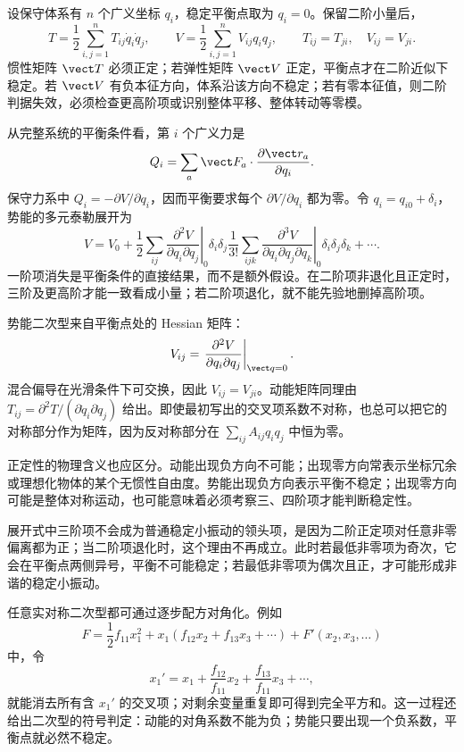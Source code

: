 设保守体系有 $n$ 个广义坐标 $q_i$，稳定平衡点取为 $q_i=0$。保留二阶小量后，
\begin{equation}
 T=\frac12\sum_{i,j=1}^nT_{ij}\dot q_i\dot q_j,\qquad
 V=\frac12\sum_{i,j=1}^nV_{ij}q_iq_j,\qquad
 T_{ij}=T_{ji},\quad V_{ij}=V_{ji}.
 \label{r2ch04:eq:019}
\end{equation}
惯性矩阵 $\vect T$ 必须正定；若弹性矩阵 $\vect V$ 正定，平衡点才在二阶近似下稳定。若 $\vect V$ 有负本征方向，体系沿该方向不稳定；若有零本征值，则二阶判据失效，必须检查更高阶项或识别整体平移、整体转动等零模。

从完整系统的平衡条件看，第 $i$ 个广义力是
\[
 Q_i=\sum_a\vect F_a\cdot\frac{\partial\vect r_a}{\partial q_i}.
\]
保守力系中 $Q_i=-\partial V/\partial q_i$，因而平衡要求每个 $\partial V/\partial q_i$ 都为零。令 $q_i=q_{i0}+\delta_i$，势能的多元泰勒展开为
\[
 V=V_0+\frac12\sum_{ij}
 \left.\frac{\partial^2V}{\partial q_i\partial q_j}\right|_0
 \delta_i\delta_j
\frac1{3!}\sum_{ijk}
 \left.\frac{\partial^3V}{\partial q_i\partial q_j\partial q_k}\right|_0
 \delta_i\delta_j\delta_k+\cdots .
\]
一阶项消失是平衡条件的直接结果，而不是额外假设。在二阶项非退化且正定时，三阶及更高阶才能一致看成小量；若二阶项退化，就不能先验地删掉高阶项。

势能二次型来自平衡点处的 Hessian 矩阵：
\[
 V_{ij}=\left.\frac{\partial^2V}{\partial q_i\partial q_j}\right|_{\vect q=0}.
\]
混合偏导在光滑条件下可交换，因此 $V_{ij}=V_{ji}$。动能矩阵同理由
$T_{ij}=\partial^2T/(\partial\dot q_i\partial\dot q_j)$ 给出。即使最初写出的交叉项系数不对称，也总可以把它的对称部分作为矩阵，因为反对称部分在
$\sum_{ij}A_{ij}q_iq_j$ 中恒为零。

正定性的物理含义也应区分。动能出现负方向不可能；出现零方向常表示坐标冗余或理想化物体的某个无惯性自由度。势能出现负方向表示平衡不稳定；出现零方向可能是整体对称运动，也可能意味着必须考察三、四阶项才能判断稳定性。

展开式中三阶项不会成为普通稳定小振动的领头项，是因为二阶正定项对任意非零偏离都为正；当二阶项退化时，这个理由不再成立。此时若最低非零项为奇次，它会在平衡点两侧异号，平衡不可能稳定；若最低非零项为偶次且正，才可能形成非谐的稳定小振动。

任意实对称二次型都可通过逐步配方对角化。例如
\[
 F=\frac12f_{11}x_1^2+x_1(f_{12}x_2+f_{13}x_3+\cdots)
 +F'(x_2,x_3,\ldots)
\]
中，令
\[
 x_1'=x_1+\frac{f_{12}}{f_{11}}x_2+
 \frac{f_{13}}{f_{11}}x_3+\cdots,
\]
就能消去所有含 $x_1'$ 的交叉项；对剩余变量重复即可得到完全平方和。这一过程还给出二次型的符号判定：动能的对角系数不能为负；势能只要出现一个负系数，平衡点就必然不稳定。

